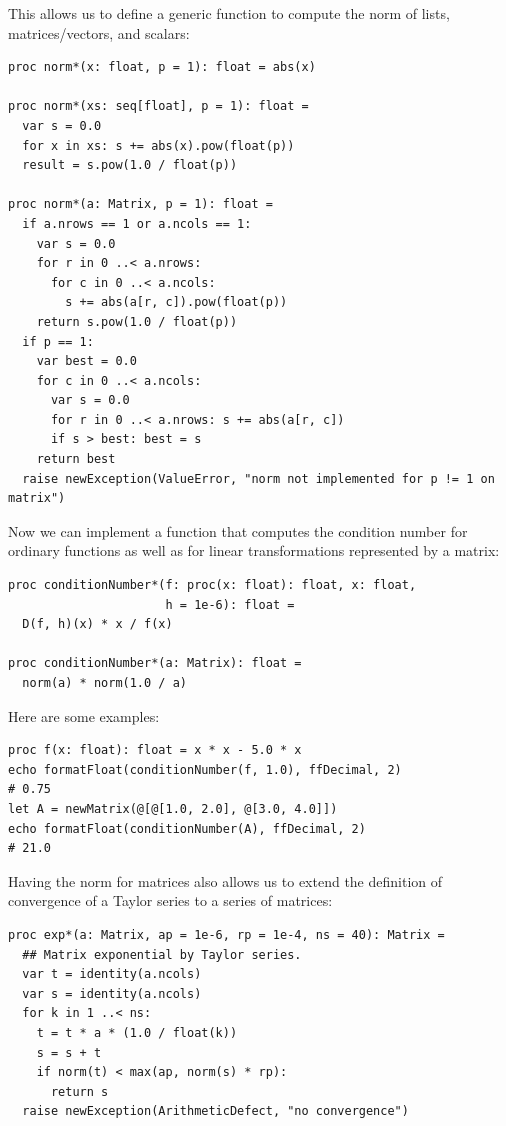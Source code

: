 \documentclass[justified, sixbynine]{tufte-book}
\def\ft{\small\tt}
\theoremstyle{plain}%
\newtheorem * {corollary}{Corollary}
\theoremstyle{definition}
\theoremstyle{remark}
\newtheorem * {remark}{Remark}
\newtheorem * {note}{Note}
\begin{document}
\begin{fullwidth}
This allows us to define a generic function to compute the norm of lists, matrices/vectors, and scalars:

\begin{lstlisting}[caption={in file: {\ft nlib.nim}}]
proc norm*(x: float, p = 1): float = abs(x)

proc norm*(xs: seq[float], p = 1): float =
  var s = 0.0
  for x in xs: s += abs(x).pow(float(p))
  result = s.pow(1.0 / float(p))

proc norm*(a: Matrix, p = 1): float =
  if a.nrows == 1 or a.ncols == 1:
    var s = 0.0
    for r in 0 ..< a.nrows:
      for c in 0 ..< a.ncols:
        s += abs(a[r, c]).pow(float(p))
    return s.pow(1.0 / float(p))
  if p == 1:
    var best = 0.0
    for c in 0 ..< a.ncols:
      var s = 0.0
      for r in 0 ..< a.nrows: s += abs(a[r, c])
      if s > best: best = s
    return best
  raise newException(ValueError, "norm not implemented for p != 1 on matrix")
\end{lstlisting}

Now we can implement a function that computes the condition number for ordinary functions as well as for linear transformations represented by a matrix:

\begin{lstlisting}[caption={in file: {\ft nlib.nim}}]
proc conditionNumber*(f: proc(x: float): float, x: float,
                      h = 1e-6): float =
  D(f, h)(x) * x / f(x)

proc conditionNumber*(a: Matrix): float =
  norm(a) * norm(1.0 / a)
\end{lstlisting}

Here are some examples:

\begin{lstlisting}
proc f(x: float): float = x * x - 5.0 * x
echo formatFloat(conditionNumber(f, 1.0), ffDecimal, 2)
# 0.75
let A = newMatrix(@[@[1.0, 2.0], @[3.0, 4.0]])
echo formatFloat(conditionNumber(A), ffDecimal, 2)
# 21.0
\end{lstlisting}


Having the norm for matrices also allows us to extend the definition of convergence of a Taylor series to a series of matrices:

\begin{lstlisting}[caption={in file: {\ft nlib.nim}}]
proc exp*(a: Matrix, ap = 1e-6, rp = 1e-4, ns = 40): Matrix =
  ## Matrix exponential by Taylor series.
  var t = identity(a.ncols)
  var s = identity(a.ncols)
  for k in 1 ..< ns:
    t = t * a * (1.0 / float(k))
    s = s + t
    if norm(t) < max(ap, norm(s) * rp):
      return s
  raise newException(ArithmeticDefect, "no convergence")
\end{lstlisting}


\end{fullwidth}
\end{document}
